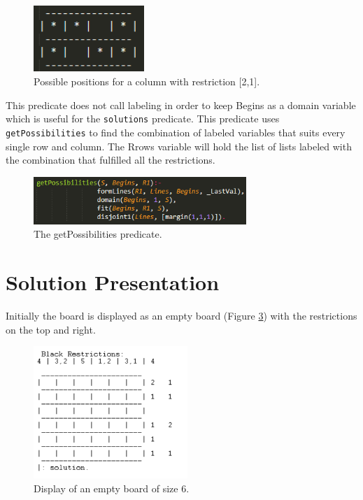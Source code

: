 \documentclass[runningheads,a4paper]{llncs}
\begin{document}
	\begin{figure}[h]
	\centering
	\includegraphics[height=2.5cm]{possibilities.png}
	\caption{Possible positions for a column with restriction [2,1].}
	\label{possibilities}
	\end{figure}

	This predicate does not call labeling in order to keep Begins as a domain variable which is useful for the \verb|solutions| predicate. This predicate uses \verb|getPossibilities| to find the combination of labeled variables that suits every single row and column. The Rrows variable will hold the list of lists labeled with the combination that fulfilled all the restrictions. 

	\begin{figure}[h]
	\centering
	\includegraphics[height=1.8cm]{getPossibilities.png}
	\caption{The getPossibilities predicate.}
	\label{getPossibilities}
	\end{figure}

\newpage
\section{Solution Presentation}

	Initially the board is displayed as an empty board (Figure \ref{empty}) with the restrictions on the top and right. 

	\begin{figure}[h]
	\centering
	\includegraphics[height=5cm]{empty.png}
	\caption{Display of an empty board of size 6.}
	\label{empty}
	\end{figure}
\end{document}
